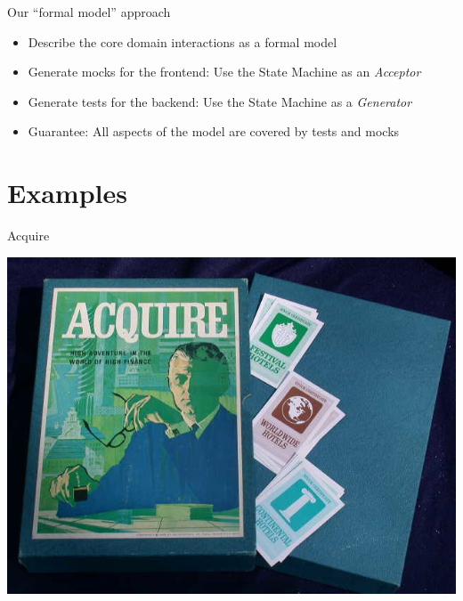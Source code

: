 \begin{frame}[fragile]{Our ``formal model'' approach}

  \begin{itemize}[<+->]
  \item Describe the core domain interactions as a formal model
  \item Generate mocks for the frontend: Use the State Machine as an \emph{Acceptor}
  \item Generate tests for the backend: Use the State Machine as a \emph{Generator}
  \item Guarantee: All aspects of  the model are covered by tests and mocks
  \end{itemize}

\end{frame}


\part{Examples}

\begin{frame}[fragile]{Acquire}
  \begin{center}
    \includegraphics[height=.8\textheight]{./images/acquire-boardgame.jpg}
  \end{center}
\end{frame}

